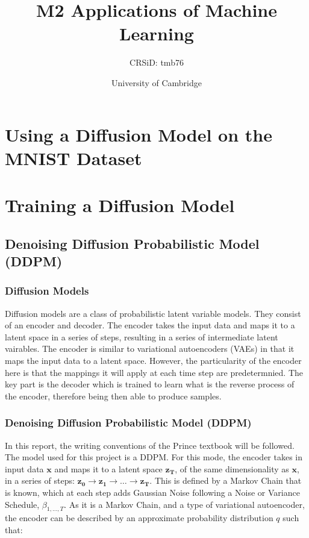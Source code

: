 \documentclass[12pt]{report} %
\title{M2 Applications of Machine Learning}
\author{CRSiD: tmb76}
\date{University of Cambridge}
\begin{document}
\maketitle

\tableofcontents

\chapter*{Using a Diffusion Model on the MNIST Dataset}

\chapter{Training a Diffusion Model}

\section{Denoising Diffusion Probabilistic Model (DDPM)}

\subsection{Diffusion Models}

Diffusion models are a class of probabilistic latent variable models. They consist of an encoder and decoder. The encoder takes the input data and maps it to a latent space in a series of steps, resulting in a series of intermediate latent vairables. The encoder is similar to variational autoencoders (VAEs) in that it maps the input data to a latent space. However, the particularity of the encoder here is that the mappings it will apply at each time step are predetermnied. The key part is the decoder which is trained to learn what is the reverse process of the encoder, therefore being then able to produce samples\cite[p.348]{prince2023understanding}.

\subsection{Denoising Diffusion Probabilistic Model (DDPM)}

In this report, the writing conventions of the Prince textbook will be followed\cite{prince2023understanding}. The model used for this project is a DDPM. For this mode, the encoder takes in input data $\mathbf{x}$ and maps it to a latent space $\mathbf{z_{T}}$, of the same dimensionality as $\mathbf{x}$, in a series of steps: $\mathbf{z_{0}} \rightarrow \mathbf{z_{1}} \rightarrow \ldots \rightarrow \mathbf{z_{T}}$. This is defined by a Markov Chain that is known, which at each step adds Gaussian Noise following a Noise or Variance Schedule, $\beta_{1, \dots, T}$. As it is a Markov Chain, and a type of variational autoencoder, the encoder can be described by an approximate probability distribution $q$ such that\cite{ho2020denoising}:
\end{document}
